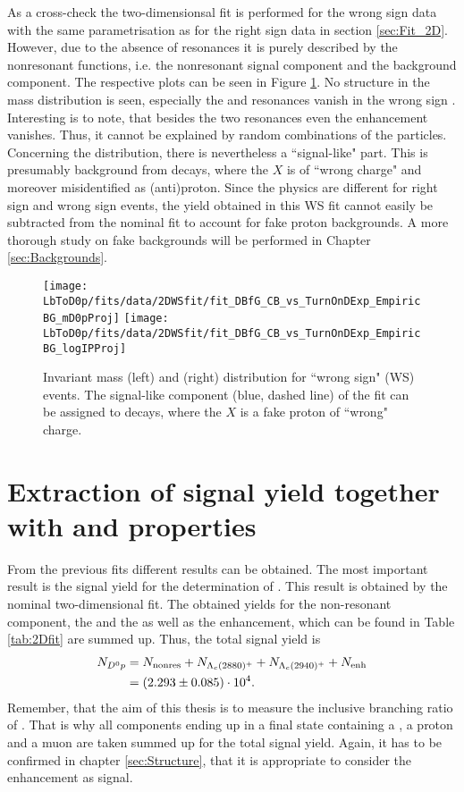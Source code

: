 As a cross-check the two-dimensionsal fit is performed for the wrong sign data with the same parametrisation as for the right sign data in section \ref{sec:Fit_2D}.
However, due to the absence of resonances it is purely described by the nonresonant functions, i.e. the nonresonant signal component and the background component.
The respective plots can be seen in Figure \ref{fig:fit_2D_WS}. 
No structure in the mass distribution is seen, especially the \LcResI and \LcResII resonances vanish in the wrong sign \Dz\proton.
Interesting is to note, that besides the two resonances even the enhancement vanishes.
Thus, it cannot be explained by random combinations of the particles.
Concerning the \logIP distribution, there is nevertheless a ``signal-like" part. 
This is presumably background from \BToDmunuX decays, where the $X$ is of ``wrong charge" and moreover misidentified as (anti)proton.
Since the physics are different for right sign and wrong sign events, the yield obtained in this WS fit cannot easily be subtracted from the nominal fit to account for fake proton backgrounds.
A more thorough study on fake backgrounds will be performed in Chapter \ref{sec:Backgrounds}.
\begin{figure}[ptb]
	\centering
	\texttt{[image: LbToD0p/fits/data/2DWSfit/fit\_DBfG\_CB\_vs\_TurnOnDExp\_EmpiricBG\_mD0pProj]}
	\texttt{[image: LbToD0p/fits/data/2DWSfit/fit\_DBfG\_CB\_vs\_TurnOnDExp\_EmpiricBG\_logIPProj]}
	\caption{Invariant \Dz\proton mass (left) and \logIP (right) distribution for ``wrong sign" (WS) events.
             The signal-like component (blue, dashed line) of the fit can be assigned to \BToDmunuX decays, where the $X$ is a fake proton of ``wrong" charge.}
	\label{fig:fit_2D_WS}
\end{figure}


\section{Extraction of \LbToDpmunuX signal yield together with \LcResI and \LcResII properties}
\label{sec:Signalyield_D0p}
From the previous fits different results can be obtained. 
The most important result is the \LbToDpmunuX signal yield \NDp for the determination of \R.
This result is obtained by the nominal two-dimensional fit.
The obtained yields for the non-resonant component, the \LcResI and the \LcResII as well as the enhancement, which can be found in Table \ref{tab:2Dfit} are summed up.
Thus, the total \LbToDpmunuX signal yield is
\begin{align*}
    N_{{{D}^0}{p}} &= N_{\text{nonres}} + N_{{\Lambda}_{c}(2880)^+} + N_{{\Lambda}_{c}(2940)^+} + N_{\text{enh}} \\
         &= (2.293 \pm 0.085)\cdot 10^{4}. 
\end{align*}
Remember, that the aim of this thesis is to measure the inclusive branching ratio of \LbToDpmunuX.
That is why all components ending up in a final state containing a \Dz, a proton and a muon are taken summed up for the total signal yield.
Again, it has to be confirmed in chapter \ref{sec:Structure}, that it is appropriate to consider the enhancement as signal.

